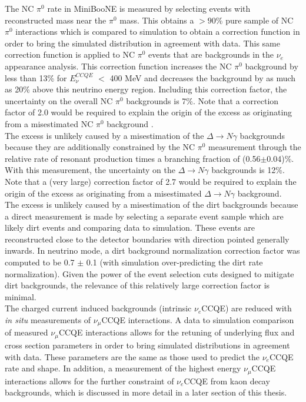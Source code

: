 The NC $\pi^0$ rate in MiniBooNE is measured by selecting events with reconstructed mass near the $\pi^0$ mass. This obtains a $>90$\% pure sample of NC $\pi^0$ interactions which is compared to simulation to obtain a correction function in order to bring the simulated distribution in agreement with data. This same correction function is applied to NC $\pi^0$ events that are backgrounds in the $\nu_e$ appearance analysis. This correction function increases the NC $\pi^0$ background by less than 13\% for $E_\nu^{CCQE}$ $<$ 400 MeV and decreases the background by as much as 20\% above this neutrino energy region. Including this correction factor, the uncertainty on the overall NC $\pi^0$ backgrounds is 7\%. Note that a correction factor of 2.0 would be required to explain the origin of the excess as originating from a misestimated NC $\pi^0$ background \cite{GeorgiaThesis}.\\

The excess is unlikely caused by a misestimation of the $\Delta\rightarrow N\gamma$ backgrounds because they are additionally constrained by the NC $\pi^0$ measurement through the relative rate of resonant production times a branching fraction of (0.56$\pm$0.04)\%. With this measurement, the uncertainty on the $\Delta\rightarrow N\gamma$ backgrounds is 12\%. Note that a (very large) correction factor of 2.7 would be required to explain the origin of the excess as originating from a misestimated $\Delta \rightarrow N\gamma$ background.\\

The excess is unlikely caused by a misestimation of the dirt backgrounds because a direct measurement is made by selecting a separate event sample which are likely dirt events and comparing data to simulation. These events are reconstructed close to the detector boundaries with direction pointed generally inwards. In neutrino mode, a dirt background normalization correction factor was computed to be 0.7 $\pm$ 0.1 (with simulation over-predicting the dirt rate normalization). Given the power of the event selection cuts designed to mitigate dirt backgrounds, the relevance of this relatively large correction factor is minimal.\\

The charged current induced backgrounds (intrinsic $\nu_e$CCQE) are reduced with \textit{in situ} measurements of $\nu_\mu$CCQE interactions. A data to simulation comparison of measured $\nu_\mu$CCQE interactions allows for the retuning of underlying flux and cross section parameters in order to bring simulated distributions in agreement with data. These parameters are the same as those used to predict the $\nu_e$CCQE rate and shape. In addition, a measurement of the highest energy $\nu_\mu$CCQE interactions allows for the further constraint of $\nu_e$CCQE from kaon decay backgrounds, which is discussed in more detail in a later section of this thesis.\\

